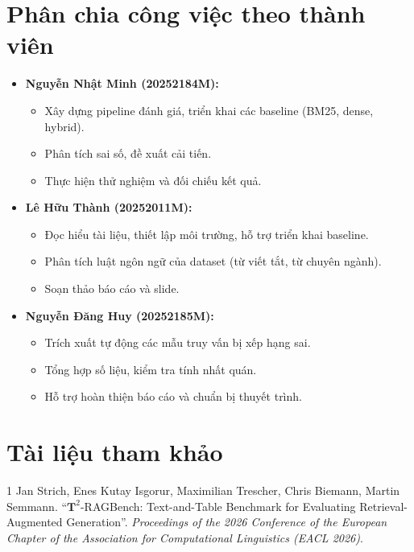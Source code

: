 \documentclass[12pt,a4paper]{article}
\begin{document}
\section{Phân chia công việc theo thành viên}

\begin{itemize}
    \item \textbf{Nguyễn Nhật Minh (20252184M):} 
    \begin{itemize}
        \item Xây dựng pipeline đánh giá, triển khai các baseline (BM25, dense, hybrid).
        \item Phân tích sai số, đề xuất cải tiến.
        \item Thực hiện thử nghiệm và đối chiếu kết quả.
    \end{itemize}
    \item \textbf{Lê Hữu Thành (20252011M):} 
    \begin{itemize}
        \item Đọc hiểu tài liệu, thiết lập môi trường, hỗ trợ triển khai baseline.
        \item Phân tích luật ngôn ngữ của dataset (từ viết tắt, từ chuyên ngành).
        \item Soạn thảo báo cáo và slide.
    \end{itemize}
    \item \textbf{Nguyễn Đăng Huy (20252185M):} 
    \begin{itemize}
        \item Trích xuất tự động các mẫu truy vấn bị xếp hạng sai.
        \item Tổng hợp số liệu, kiểm tra tính nhất quán.
        \item Hỗ trợ hoàn thiện báo cáo và chuẩn bị thuyết trình.
    \end{itemize}
\end{itemize}

\section*{Tài liệu tham khảo}
\begin{thebibliography}{1}
Jan Strich, Enes Kutay Isgorur, Maximilian Trescher, Chris Biemann, Martin Semmann.
“$\mathbf{T}^2$-RAGBench: Text-and-Table Benchmark for Evaluating Retrieval-Augmented Generation”.
\textit{Proceedings of the 2026 Conference of the European Chapter of the Association for Computational Linguistics (EACL 2026)}.
\end{thebibliography}
\end{document}
